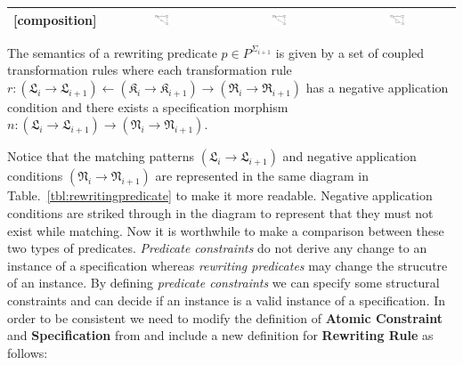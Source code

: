 \documentclass{eceasst}
\begin{document}
\begin{table}[h]
\begin{center}
\begin{tabular}{| l | c | c | c | }
    [composition] 	& \includegraphics[width=0.13\textwidth]{comp-L.pdf} & \includegraphics[width=0.13\textwidth]{comp-R.pdf} & \includegraphics[width=0.13\textwidth]{comp-vis.pdf}  \\ %
    \hline    
    \end{tabular}
    \end{center}
\end{table}
\normalsize

\begin{definition}
 The semantics of a rewriting predicate $p \in P^{\Sigma_{i+1}}$ is given by a set of coupled transformation rules where each transformation 
 rule $r: (\mathfrak{L}_i \rightarrow \mathfrak{L}_{i+1})   \leftarrow (\mathfrak{K}_i \rightarrow \mathfrak{K}_{i+1})  \rightarrow 
 (\mathfrak{R}_i \rightarrow \mathfrak{R}_{i+1}) $ has a negative application condition and there exists a specification morphism 
 $n: (\mathfrak{L}_i \rightarrow \mathfrak{L}_{i+1}) \rightarrow (\mathfrak{N}_i \rightarrow \mathfrak{N}_{i+1}) $. 
\end{definition}

Notice that the matching patterns $(\mathfrak{L}_i \rightarrow \mathfrak{L}_{i+1})$ and negative application conditions $(\mathfrak{N}_i \rightarrow \mathfrak{N}_{i+1}) $ 
are represented in the same diagram in 
Table.~\ref{tbl:rewritingpredicate} to make it more readable. Negative application conditions are striked through in the diagram to represent that they must not exist while matching. 
Now it is worthwhile to make a comparison between these two types of predicates. 
\textit{Predicate constraints} do not derive any change to an instance of a specification whereas \textit{rewriting predicates} may change the strucutre of an instance. 
By defining \textit{predicate constraints} we can specify some structural constraints and can decide if an instance is a valid instance of a specification. 
In order to be consistent we need to modify the definition of \textbf{Atomic Constraint} and \textbf{Specification} from \cite{Rutle10} and include a new definition for \textbf{Rewriting Rule} as follows:
\end{document}
